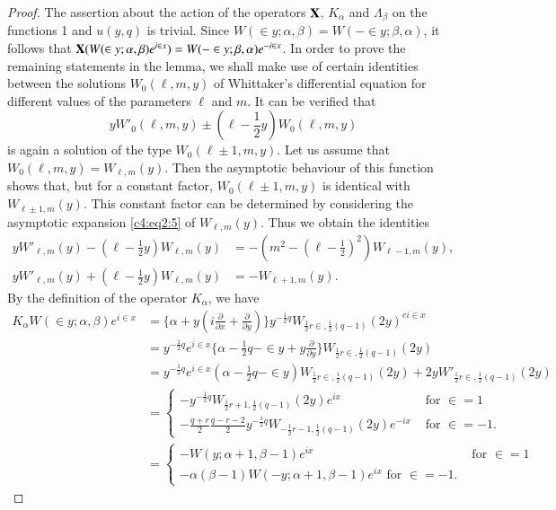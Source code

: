 \begin{proof}
The \pageoriginale assertion about the action of the operators $\mathbf{X}$,
$K_{\alpha}$ and $\Lambda_{\beta}$ on the functions 1 and $u(y,q)$ is
trivial. Since $W(\in y ; \alpha, \beta)=W(-\in y;
\beta, \alpha)$, it follows that $\mathbf{X}(W(\in y ; \alpha,
\beta)e^{i\in x}) = W(-\in y; \beta,
\alpha)e^{-i\in x}$. In order to prove the remaining
statements in the lemma, we shall make use of certain identities
between the solutions $W_0(\ell,m,y)$ of Whittaker's differential
equation for different values of the parameters $\ell$ and $m$. It can
be verified that
$$
yW'_0 (\ell, m, y) \pm (\ell-\frac{1}{2}y) W_0 (\ell, m, y)
$$
is again a solution of the type $W_0(\ell \pm 1, m,y)$. Let us assume
that $W_0(\ell,m,y)=W_{\ell,m}(y)$. Then the asymptotic behaviour of
this function shows that, but for a constant factor, $W_0(\ell \pm 1,
m,y)$ is identical with $W_{\ell\pm 1, m}(y)$. This constant factor
can be determined by considering the asymptotic expansion 
\eqref{c4:eq2:5} of $W_{\ell,m}(y)$. Thus we obtain the identities
\begin{align*}
yW'_{\ell,m}(y) - (\ell - \frac{1}{2}y) W_{\ell,m}(y) & = -(m^2-(\ell-\frac{1}{2})^2)
W_{\ell-1,m}(y),\\
yW'_{\ell,m}(y) + (\ell -\frac{1}{2}y) W_{\ell,m}(y) & =
-W_{\ell+1,m}(y).
\end{align*}
By the definition of the operator $K_{\alpha}$, we have
{\fontsize{9}{11}\selectfont
\begin{align*}
K_{\alpha}W(\in y; \alpha, \beta) e^{i\in x} & = 
\{\alpha + y (i\frac{\partial}{\partial x} + \frac{\partial}{\partial
  y})\} y^{-\frac{1}{2}q} W_{\frac{1}{2}r\in,
  \frac{1}{2}(q-1)} (2y)^{ei\in x}\\
& = y^{-\frac{1}{2}q} e^{i\in x} \{\alpha -\frac{1}{2} q -
\in y + y \frac{\partial}{\partial y}\}
W_{\frac{1}{2}r\in, \frac{1}{2}(q-1)} (2y)\\
& = y^{-\frac{1}{2}q} e^{i\in x} (\alpha
-\frac{1}{2}q-\in y) W_{\frac{1}{2}r\in,
  \frac{1}{2}(q-1)} (2y) + 2y W'_{\frac{1}{2}r\in,
  \frac{1}{2}(q-1)} (2y)\\
& = \begin{cases}
-y^{-\frac{1}{2}q} W_{\frac{1}{2}r+1, \frac{1}{2}(q-1)} (2y) e^{ix} &
\text{ for } \in =1\\
-\frac{q+r}{2} \frac{q-r-2}{2} y^{-\frac{1}{2}q} W_{-\frac{1}{2}r-1,
  \frac{1}{2}(q-1)} (2y) e^{-ix} & \text{ for } \in =-1.
\end{cases}\\
& = \begin{cases}
-W(y;\alpha +1, \beta -1)e^{ix} & \text{ for } \in=1\\
-\alpha (\beta-1) W(-y;\alpha + 1, \beta-1) e^{ix} \text{ for }
\in =-1.
\end{cases}
\end{align*}}\relax\pageoriginale


\end{proof}
